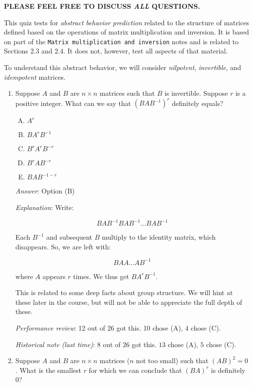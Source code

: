\documentclass[10pt]{amsart}
\begin{document}
{\bf PLEASE FEEL FREE TO DISCUSS {\em ALL} QUESTIONS.}

This quiz tests for {\em abstract behavior prediction} related to the
structure of matrices defined based on the operations of matrix
multiplication and inversion. It is based on part of the {\tt Matrix
  multiplication and inversion} notes and is related to Sections 2.3
and 2.4. It does not, however, test all aspects of that material.

To understand this abstract behavior, we will consider {\em
  nilpotent}, {\em invertible}, and {\em idempotent} matrices.

\begin{enumerate}

\item Suppose $A$ and $B$ are $n \times n$ matrices such that $B$ is
  invertible. Suppose $r$ is a positive integer. What can we say that
  $(BAB^{-1})^r$ definitely equals?

  \begin{enumerate}[(A)]
  \item $A^r$
  \item $BA^rB^{-1}$
  \item $B^rA^rB^{-r}$
  \item $B^rAB^{-r}$
  \item $BAB^{-1-r}$
  \end{enumerate}

  {\em Answer}: Option (B)

  {\em Explanation}: Write:

  $$BAB^{-1}BAB^{-1} \dots BAB^{-1}$$

  Each $B^{-1}$ and subsequent $B$ multiply to the identity matrix,
  which disappears. So, we are left with:

  $$BAA\dots AB^{-1}$$

  where $A$ appears $r$ times. We thus get $BA^rB^{-1}$.

  This is related to some deep facts about group structure. We will
  hint at these later in the course, but will not be able to
  appreciate the full depth of these.
  
  {\em Performance review}: 12 out of 26 got this. 10 chose (A), 4 chose (C).

  {\em Historical note (last time)}: $8$ out of $26$ got this. $13$ chose (A),
  $5$ chose (C).
\item Suppose $A$ and $B$ are $n \times n$ matrices ($n$ not too
  small) such that $(AB)^2 = 0$. What is the smallest $r$ for which we
  can conclude that $(BA)^r$ is definitely $0$?


\end{enumerate}
\end{document}
